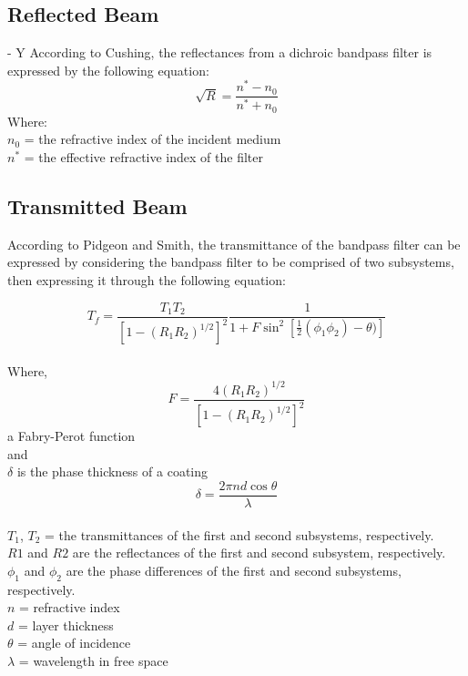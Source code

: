 \subsection{Reflected Beam} - Y
According to Cushing, the reflectances from a dichroic bandpass filter is expressed by the following equation:
\begin{equation}
    \sqrt R = \frac{n^* - n_0}{n^* + n_0}
\end{equation}
Where:
\\
$n_0$ = the refractive index of the incident medium
\\
$n^*$ = the effective refractive index of the filter


\subsection{Transmitted Beam}
According to Pidgeon and Smith, the transmittance of the bandpass filter can be expressed by considering the bandpass filter to be comprised of two subsystems, then expressing it through the following equation:

\begin{equation}
T_f = \frac{T_1 T_2}{[1-(R_1R _2)^{1/2}]^2}\frac{1}{1+F\sin^2[\frac{1}{2}(\phi_1\phi_2)-\theta)]}
\end{equation}
\\
Where,
\\
\begin{equation}
    F=\frac{4(R_1R_2)^{1/2}}{[1-(R_1R_2)^{1/2}]^2}
\end{equation} a Fabry-Perot function
\\
and 
\\
$\delta$ is the phase thickness of a coating
\begin{equation}
\delta = \frac{2\pi n d \cos\theta}{\lambda}
\end{equation}
\\
$T_1$, $T_2$ = the transmittances of the first and second subsystems, respectively. 
\\
$R1$ and $R2$ are the reflectances of the first and second subsystem, respectively. \\
$\phi_1$ and $\phi_2$ are the phase differences of the first and second subsystems, respectively. 
\\
$n$ = refractive index
\\
$d$ = layer thickness
\\
$\theta$ = angle of incidence
\\
$\lambda$ = wavelength in free space

